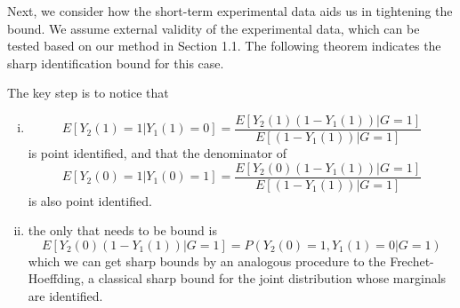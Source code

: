 \documentclass[uplatex,dvipdfmx]{jsarticle}
\begin{document}
Next, we consider how the short-term experimental data aids us in tightening the bound. We assume external validity of the experimental data, which can be tested based on our method in Section 1.1. The following theorem indicates the sharp identification bound for this case.

The key step is to notice that
\begin{enumerate}[(i)]
    \item \[E[ Y_2(1)=1 | Y_1(1)=0]=\frac{E[Y_2(1)(1-Y_1(1))|G=1 ]}{ E[(1-Y_1(1))|G=1]}\]
    is point identified, and that the denominator of 
    \[E[ Y_2(0)=1| Y_1(0)=1 ] = \frac{E[Y_2(0)(1-Y_1(1))|G=1 ]}{ E[(1-Y_1(1))|G=1]}\]
    is also point identified.
    \item the only that needs to be bound is \[E[Y_2(0)(1-Y_1(1))|G=1 ] = P( Y_2(0) =1, Y_1(1)=0|G=1)\] 
    which we can get sharp bounds by an analogous procedure to the Frechet-Hoeffding, a classical sharp bound for the joint distribution whose marginals are identified.
\end{enumerate}
\end{document}
